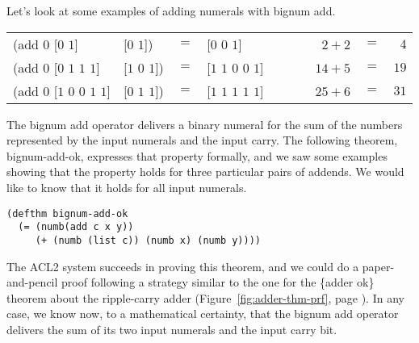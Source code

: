 Let's look at some examples of adding numerals with bignum \textsf{add}.
\begin{center}
\addtolength{\tabcolsep}{-4pt}
\begin{tabular}{llclr|l|rcr}
\textsf{(add $0$ [$0$ $1$]}             &\textsf{[$0$ $1$])}     & $=$ &\textsf{[$0$ $0$ $1$]}         &&& ~~$2 + 2$  &$=$& $4$  \\
\textsf{(add $0$ [$0$ $1$ $1$ $1$]}     &\textsf{[$1$ $0$ $1$])} & $=$ &\textsf{[$1$ $1$ $0$ $0$ $1$]} &&& ~~$14 + 5$ &$=$& $19$ \\
\textsf{(add $0$ [$1$ $0$ $0$ $1$ $1$]} &\textsf{[$0$ $1$ $1$])} & $=$ &\textsf{[$1$ $1$ $1$ $1$ $1$]} &&& ~~$25 + 6$ &$=$& $31$ \\
\end{tabular}
\addtolength{\tabcolsep}{4pt}
\end{center}

The bignum \textsf{add} operator
delivers a binary numeral for the sum of
the numbers represented by the input numerals and the input carry.
The following theorem, \textsf{bignum-add-ok},
expresses that property formally,
and we saw some examples showing
that the property holds for three
particular pairs of addends.
We would like to know that it
holds for all input numerals.

\label{bignum-adder-thm}
\begin{code}
\begin{verbatim}
(defthm bignum-add-ok
  (= (numb(add c x y))
     (+ (numb (list c)) (numb x) (numb y))))
\end{verbatim}
\end{code}

The ACL2 system succeeds in proving this theorem,
and we could do a paper-and-pencil proof following a strategy
similar to the one for the \{adder ok\} theorem about the ripple-carry adder
(Figure~\ref{fig:adder-thm-prf}, page \pageref{fig:adder-thm-prf}).
In any case, we know now, to a mathematical certainty,
that the bignum \textsf{add} operator delivers
the sum of its two input numerals and the input carry bit.

\begin{exercises}

\end{exercises}

